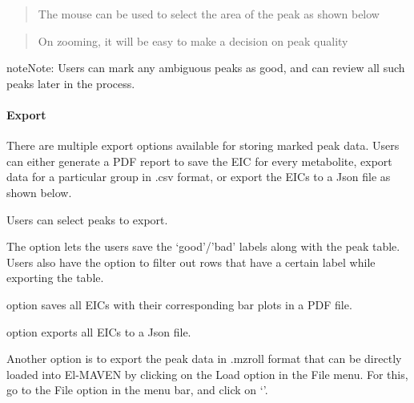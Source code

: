 \documentclass[letterpaper,10pt,english,openany,oneside]{sphinxmanual}
\begin{document}
\begin{quote}

The mouse can be used to select the area of the peak as shown below
\end{quote}

\begin{quote}

On zooming, it will be easy to make a decision on peak quality
\end{quote}


\begin{sphinxadmonition}{note}{Note:}
Users can mark any ambiguous peaks as good, and can review all such peaks later in the process.
\end{sphinxadmonition}


\paragraph{Export}
\label{\detokenize{LabeledLCMSWorkflow:export}}
There are multiple export options available for storing marked peak data. Users can either generate a PDF report to save the EIC for every metabolite, export data for a particular group in .csv format, or export the EICs to a Json file as shown below.


Users can select  peaks to export.


The  option  lets the users save the ‘good’/’bad’ labels along with the peak table. Users also have the option to filter out rows that have a certain label while exporting the table.

 option  saves all EICs with their corresponding bar plots in a PDF file.

 option  exports all EICs to a Json file.

Another option is to export the peak data in .mzroll format that can be directly loaded into El-MAVEN by clicking on the Load  option in the File menu. For this, go to the File option in the menu bar, and click on ‘’.
\end{document}
